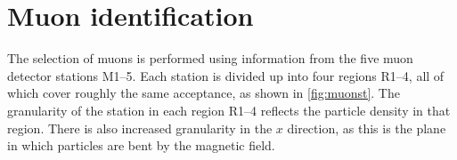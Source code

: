 




\section{Muon identification}
\label{sec:muonID}
The selection of muons is performed using information from the five muon detector stations M1--5. Each station is divided up into four regions R1--4, all of which cover roughly the same acceptance, as shown in \autoref{fig:muonst}. The granularity of the station in each region R1--4 reflects the particle density in that region. There is also increased granularity in the $x$ direction, as this is the plane in which particles are bent by the magnetic field.

